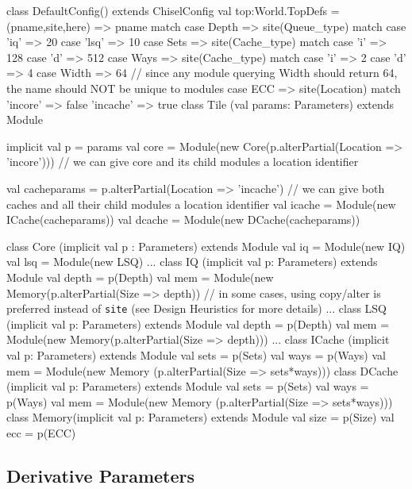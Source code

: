 \documentclass[10pt,twocolumn]{article}
\def\code#1{{\small\tt #1}}
\begin{document}
\begin{scala}
class DefaultConfig() extends ChiselConfig {
  val top:World.TopDefs = {
    (pname,site,here) => pname match {
      case Depth => site(Queue_type) match {
        case 'iq' => 20
        case 'lsq' => 10
      }
      case Sets => site(Cache_type) match {
        case 'i' => 128
        case 'd' => 512
      }
      case Ways => site(Cache_type) match {
        case 'i' => 2
        case 'd' => 4
      }
      case Width => 64
      // since any module querying Width should return 64, the name should NOT be unique to modules
      case ECC => site(Location) match {
        'incore' => false
        'incache' => true
      }
    }
  }
}
class Tile (val params: Parameters) extends Module { 
  implicit val p = params
  val core = Module(new Core(p.alterPartial({Location => 'incore'})))
  // we can give core and its child modules a location identifier
  
  val cacheparams = p.alterPartial({Location => 'incache'})
  // we can give both caches and all their child modules a location identifier
  val icache = Module(new ICache(cacheparams))
  val dcache = Module(new DCache(cacheparams))
}
class Core (implicit val p : Parameters) extends Module {
  val iq = Module(new IQ)
  val lsq = Module(new LSQ)
  ...
}
class IQ (implicit val p: Parameters) extends Module {
  val depth = p(Depth)
  val mem = Module(new Memory(p.alterPartial({Size => depth}))
  // in some cases, using copy/alter is preferred instead of \code{site} (see Design Heuristics for more details)
  ...
}
class LSQ (implicit val p: Parameters) extends Module {
  val depth = p(Depth)
  val mem = Module(new Memory(p.alterPartial({Size => depth})))
  ...
}
class ICache (implicit val p: Parameters) extends Module {
  val sets = p(Sets)
  val ways = p(Ways)
  val mem = Module(new Memory (p.alterPartial({Size => sets*ways})))
}
class DCache (implicit val p: Parameters) extends Module {
  val sets = p(Sets)
  val ways = p(Ways)
  val mem = Module(new Memory (p.alterPartial({Size => sets*ways})))
}
class Memory(implicit val p: Parameters) extends Module {
  val size = p(Size)
  val ecc = p(ECC)
}
\end{scala}

\subsection{Derivative Parameters}
\end{document}
